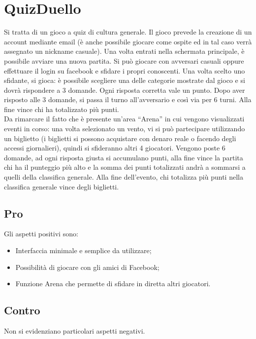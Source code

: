 \documentclass{article}
\begin{document}
\newpage

\section{QuizDuello}
Si tratta di un gioco a quiz di cultura generale. Il gioco prevede la creazione di un account mediante email (è anche possibile giocare come ospite ed in tal caso verrà assegnato un nickname casuale). Una volta entrati nella schermata principale, è possibile avviare una nuova partita. Si può giocare con avversari casuali oppure effettuare il login su facebook e sfidare i propri conoscenti. Una volta scelto uno sfidante, si gioca: è possibile scegliere una delle categorie mostrate dal gioco e si dovrà rispondere a 3 domande. Ogni risposta corretta vale un punto. Dopo aver risposto alle 3 domande, si passa il turno all'avversario e così via per 6 turni. Alla fine vince chi ha totalizzato più punti.
\\\indent
Da rimarcare il fatto che è presente un’area “Arena” in cui vengono visualizzati eventi in corso: una volta selezionato un vento, vi si può partecipare utilizzando un biglietto (i biglietti si possono acquistare con denaro reale o facendo degli accessi giornalieri), quindi si sfideranno altri 4 giocatori. Vengono poste 6 domande, ad ogni risposta giusta si accumulano punti, alla fine vince la partita chi ha il punteggio più alto e la somma dei punti totalizzati andrà a sommarsi a quelli della classifica generale. Alla fine dell’evento, chi totalizza più punti nella classifica generale vince degli biglietti.

\subsection{Pro}
Gli aspetti positivi sono:
\begin{itemize}
\item Interfaccia minimale e semplice da utilizzare;
\item Possibilità di giocare con gli amici di Facebook;
\item Funzione Arena che permette di sfidare in diretta altri giocatori.
\end{itemize}

\subsection{Contro}
Non si evidenziano particolari aspetti negativi.
\end{document}
